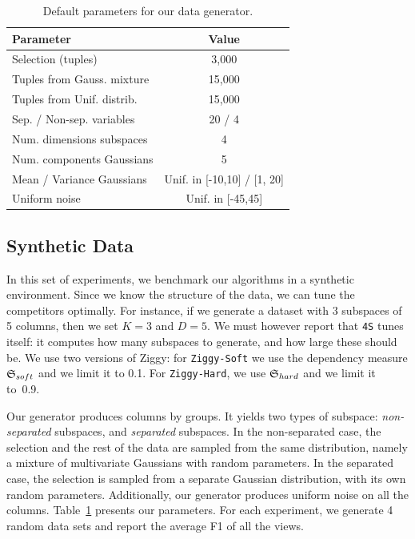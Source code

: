 \begin{table}[t!]
    \centering
    \small
    \begin{tabularx}{\columnwidth}{X  c }
      \hline
      Parameter & Value\\
      \hline
      Selection (tuples) & 3,000\\
      Tuples from Gauss. mixture & 15,000\\ 
      Tuples from Unif. distrib. & 15,000\\
      Sep. / Non-sep. variables & 20 / 4\\
      \hline
      Num. dimensions subspaces & 4\\
      Num. components Gaussians& 5\\
      Mean / Variance Gaussians & Unif. in [-10,10] / [1, 20]\\
      Uniform noise & Unif. in [-45,45]\\
      \hline
    \end{tabularx}
    \caption{Default parameters for our data generator.} 
\label{tab:synthparameters}
\end{table}

\subsection{Synthetic Data}
\label{sec:synthexp}

In this set of experiments, we benchmark our algorithms in a synthetic
environment. Since we know the structure of the data, we can tune
the competitors optimally. For instance, if we generate a dataset with 3
subspaces of 5 columns, then we set $K=3$ and $D=5$. We must however report
that \texttt{4S} tunes itself: it computes how many subspaces to generate, and
how large these should be. We use two versions of Ziggy: for
\texttt{Ziggy-Soft} we use the dependency measure $\mathfrak{S}_{soft}$ and we limit
it to 0.1. For \texttt{Ziggy-Hard}, we use $\mathfrak{S}_{hard}$ and we limit it
to~0.9.

Our generator produces columns by groups. It
yields two types of subspace: \emph{non-separated} subspaces, and
\emph{separated} subspaces. In the non-separated case, the selection and the
rest of the data are sampled from the same distribution, namely a mixture of
multivariate Gaussians with random parameters. In the separated case, the
selection is sampled from a separate Gaussian distribution, with its own random
parameters. Additionally, our generator produces uniform noise on all the
columns. Table~\ref{tab:synthparameters} presents our parameters. For each
experiment, we generate 4 random data sets and report the average F1 of all the
views.

